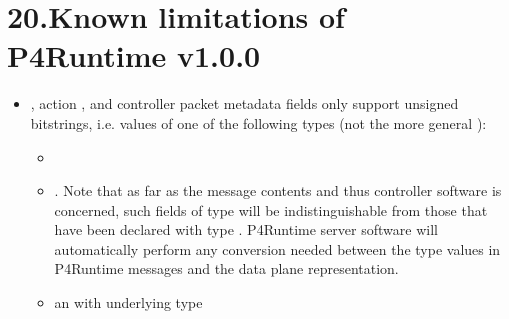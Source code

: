 \documentclass[11pt]{article}
\begin{document}
{%
\section{20.\hspace*{0.5em}Known limitations of P4Runtime v1.0.0}\label{sec-known-limitations-of-p4runtime-v100}%

\begin{itemize}%

\item{}
, action , and controller packet metadata fields only
support unsigned bitstrings, i.e. values of one of the following types (not
the more general ):%

\begin{itemize}[noitemsep,topsep=\mdcompacttopsep]%

\item{}%

\item{}.  Note that as far as the  message contents and
thus controller software is concerned, such fields of type 
will be indistinguishable from those that have been declared with
type .  P4Runtime server software will automatically
perform any conversion needed between the type  values in
P4Runtime messages and the data plane representation.%

\item{}an  with underlying type %


\end{itemize}
\end{itemize}}
\end{document}
